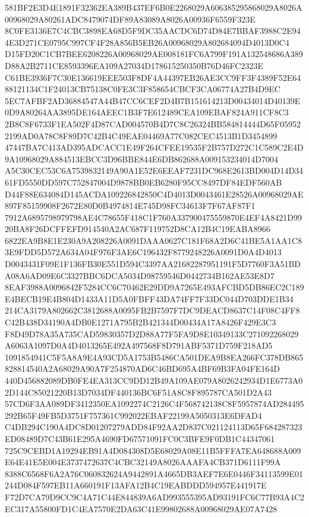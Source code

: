 \documentclass[UTF8,fontset=fandol,zihao=-4,a4paper]{ctexart}
\begin{document}
{{581BF2E3D4E1891F32362EA389B437EF6B0E2268029A606385295868029A8026A00968029A80261ADC8479074DF89A83089A8026A00936F6559F323E
8C0FE3136E7C4CBC3898EA68D5F9DC35AACDC6D74D84E7BBAF3988C2E944E3D271CE0795C997CF4F28A856B5EB26A00968029A802684094D4013D0C4
D15FD20C1CB7BEE6208226A00968029AE008181FC6A799F191A132548686A389D88A2B2711CE8593396EA109A27034D178615250350B76D46FC2323E
C61BE3936F7C30E136619EEE503F8DF4A44397EB26AE3CC9FF3F4389F52E6488121134C1F24013CB75138C0FE3C3F858654CBCF3CA06774A27B4D9EC
5EC7AFBF2AD36884547A44B47CC6CEF2D4B7B151614213D00434014D40139E0D9A80264AA3895DE164AEEC1B3F7E612489CEA109EBAF824A911CF8C3
2B8C8F6733F1EA502F4D87CAD004570B4D7C8C26324BB584814444D65F059522199AD0A78C8F89D7C42B4C49EAE04469A77C082CEC4513B1D3454899
47447BA7C413AD395ADCACC1E49F264CFEE19535F2B757D272C1C589C2E4D9A10968029A884513EBCC3D96BBE844E6DB862688A009153234014D7004
A5C30CEC53C6A7539832149A90A1E52E6EEAF7231DC968E2613BD004D14D3461FD5550DD597C752847004D9878BB0EB6280F95CC8497DF84EDF560AB
D44F88E634084D145ACDA109226842850C4D4013D0043461E28526A00968029AE897F85159908F2672E80D0B4974814E745D98FC34613F7F67AF87F1
7912A6895798979798AE4C78655F418C1F760A337900475559870E4EF4A8421D9920BA8F26DCFFEFD914540A2AC687F119752D8CA12B4C19EABA8966
6822EA9B8E1E230A9A208226A0091DAAA0627C181F68A2D6C41BE5A1AA1C83E9FDD5D572A634A04F976F3AE6C196432F8779248226A0091D0A4D4013
D0043431F09E1F136FB30E551D594C3397AA21682287951191F5D7760F3A51BDA08A6AD09E6C3327BBC6DCA5034D98759546D0442734B162AE53E8D7
8EAF3988A0096842F5284CC6C70462E29DD9A7265E493AFCBD5DB86EC2C189E4BECB19E4B804D1433A11D5A0FBFF43DA74FF7F33DC044D703DDE1B34
214CA3179A802662C3812688A0095FB2B7597F7DC9DEACD8637C14F08C4FF8C42B438D34190A4DB0E1271A795B2B421344D00434A17A8426F429E3C3
F8D49D78A35A735CAD59830357D2D88A77F5FA9D8E10349133C271092268029A6063A1097D0A4D4013265E492A497568F8D791ABF5371D759F218AD5
1091854941C5F5A8A9E4A93CD5A1753B5486CA501DEA9B8EA266FC378DB865828814540A2A68029A90A7F254870AD6C46BD695A4BF69B3FA04FE164D
440D456882089DB0FE4EA313CC9DD12B49A109AE079A8026242934D1E6773A02D144C85021220B13D7034DF440136BC6F51A8C8F895787CA501D2A43
57CD6F3AA089DF3412350EA1092274C2126C4F568742138C8F5957874AD284495292B65F49FB5D3751F757361C992022EBAF22199A5050313E6DFAD4
C4DB294C190A4DC8D01207279ADD84F92AA2D837C021124113D65F684287323ED08489D7C43B61E295A4690FD67571091FC0C3BFE9F0DB1C44347061
725C9CEBD1A19294EB91A4D084308D5E68029A08E11B5FFFA7EA648688A009E64E41E5E004E3737472637C4CBC32149A8026AAAFA4CB371D6111F99A
8388C6568F6A2A76C060832624A9442891A4665DB3AEF7E6E0446F34113599E01244D084F597EB11A660191F13AFA12B4C19EABDDD594957E441917E
F72D7CA79D9CC9C4A71C44E844839A6AD993555395AD93191FC6C77B93A4C2EC317A55800FD1C4EA7570E2DA63C41E99802688A00968029AE07A7428
}}
\end{document}
